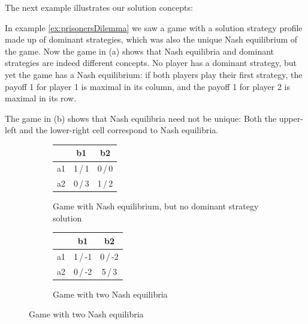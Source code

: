 \documentclass[a4paper]{scrreprt}
\begin{document}
    The next example illustrates our solution concepts:
    
    \begin{ex}
        In example \ref{ex:prisonersDilemma} we saw a game with a solution strategy profile made up of dominant strategies, which was also the unique Nash equilibrium of the game.
        Now the game in (a)
        shows that Nash equilibria and dominant strategies are indeed different concepts. No player has a dominant strategy, but yet the game has a Nash equilibrium: if both players play their first strategy, the payoff 1 for player 1 is maximal in its column, and the payoff 1 for player 2 is maximal in its row.
        
        The game in (b)
        shows that Nash equilibria need not be unique: Both the upper-left and the lower-right cell correspond to Nash equilibria.
        
        \begin{figure}[h]
            \centering
            \begin{subfigure}[t]{0.49\textwidth}
                \centering
                \begin{tabular}{c|c|c|}
                	   &   b1    &   b2    \\ \hline
                	a1 & 1\,/\,1 & 0\,/\,0 \\ \hline
                	a2 & 0\,/\,3 & 1\,/\,2 \\ \hline
                \end{tabular}
                \caption{Game with Nash equilibrium, but no dominant strategy solution}
                \label{fig:nashEquilibriumNoDominantStrategy}
            \end{subfigure}
            \begin{subfigure}[t]{0.49\textwidth}
                \centering
                \begin{tabular}{c|c|c|}
                    &   b1    &   b2    \\ \hline
                    a1 & 1\,/\,-1 & 0\,/\,-2 \\ \hline
                    a2 & 0\,/\,-2 & 5\,/\,3 \\ \hline
                \end{tabular}
                \caption{Game with two Nash equilibria}   
                \label{fig:twoNashEquilibria}
            \end{subfigure}
        \end{figure}
    \end{ex}
    
\end{document}
